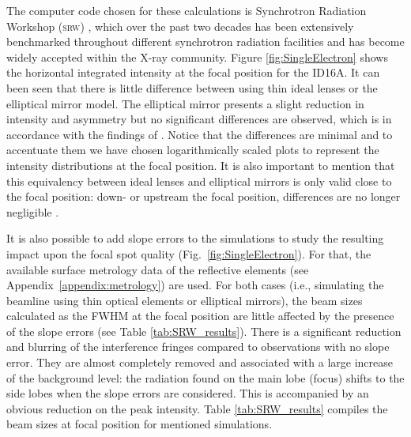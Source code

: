 \documentclass{iucr}              %
\begin{document}
The computer code chosen for these calculations is Synchrotron Radiation Workshop (\textsc{srw}) \cite{codeSRW}, which over the past two decades has been extensively benchmarked throughout different synchrotron radiation facilities and has become widely accepted within the X-ray community. Figure \ref{fig:SingleElectron} shows the horizontal integrated intensity at the focal position for the ID16A. It can been seen that there is little difference between using thin ideal lenses or the elliptical mirror model. The elliptical mirror presents a slight reduction in intensity and asymmetry but no significant differences are observed, which is in accordance with  the findings of \cite{Canestrari2014}. Notice that the differences are minimal and to accentuate them we have chosen logarithmically scaled plots to represent the intensity distributions at the focal position. It is also important to mention that this equivalency between ideal lenses and elliptical mirrors is only valid close to the focal position: down- or upstream the focal position, differences are no longer negligible \cite{Canestrari2014}. 

It is also possible to add slope errors to the simulations to study the resulting impact upon the focal spot quality (Fig.~\ref{fig:SingleElectron}). For that, the available surface metrology data of the reflective elements (see Appendix~\ref{appendix:metrology})  are used. For both cases (i.e., simulating the beamline using thin optical elements or elliptical mirrors), the beam sizes calculated as the FWHM at the focal position are little affected by the presence of the slope errors (see Table \ref{tab:SRW_results}). There is a significant reduction and blurring of the interference fringes compared to observations with no slope error. They are almost completely removed and associated with a large increase of the background level: the radiation found on the main lobe (focus) shifts to the side lobes when the slope errors are considered. This is accompanied by an obvious reduction on the peak intensity. Table \ref{tab:SRW_results} compiles the beam sizes at focal position for mentioned simulations.
\end{document}
